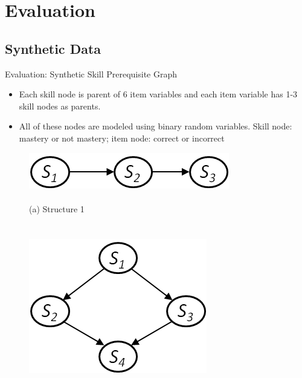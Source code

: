 \documentclass[hyperref={pdfpagelabels=false}]{beamer}
\begin{document}
\section{Evaluation} 
\subsection{Synthetic Data}

\begin{frame}{Evaluation: Synthetic Skill Prerequisite Graph}
	\begin{itemize}\small
		\item Each skill node is parent of 6 item variables and each item variable has 1-3 skill nodes as parents.
		\item All of these nodes are modeled using binary random variables. %
		Skill node: mastery or not mastery; item node: correct or incorrect
	\end{itemize}
	\begin{figure}[!ht]\small
		\begin{minipage}[b]{0.3\linewidth}
			\centering
			\includegraphics[width=0.8\linewidth]{figures/model1.png}\\~\\
			(a) Structure 1~\\~\\~\\
			\includegraphics[width=0.7\linewidth]{figures/model2.png}\\~\\

\end{minipage}
\end{figure}
\end{frame}
\end{document}
